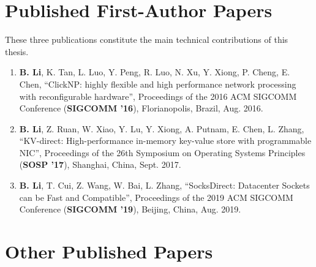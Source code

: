 
\begin{publications}

\section*{Published First-Author Papers}

These three publications constitute the main technical contributions of this thesis.

\begin{enumerate}
\item \textbf{B. Li}, K. Tan, L. Luo, Y. Peng, R. Luo, N. Xu, Y. Xiong, P. Cheng, E. Chen, ``ClickNP: highly flexible and high performance network processing with reconfigurable hardware'', Proceedings of the 2016 ACM SIGCOMM Conference (\textbf{SIGCOMM '16}), Florianopolis, Brazil, Aug. 2016.
\item \textbf{B. Li}, Z. Ruan, W. Xiao, Y. Lu, Y. Xiong, A. Putnam, E. Chen, L. Zhang, ``KV-direct: High-performance in-memory key-value store with programmable NIC'', Proceedings of the 26th Symposium on Operating Systems Principles (\textbf{SOSP '17}), Shanghai, China, Sept. 2017.
\item \textbf{B. Li}, T. Cui, Z. Wang, W. Bai, L. Zhang, ``SocksDirect: Datacenter Sockets can be Fast and Compatible'', Proceedings of the 2019 ACM SIGCOMM Conference (\textbf{SIGCOMM '19}), Beijing, China, Aug. 2019.
\end{enumerate}

\section*{Other Published Papers}


\end{publications}
